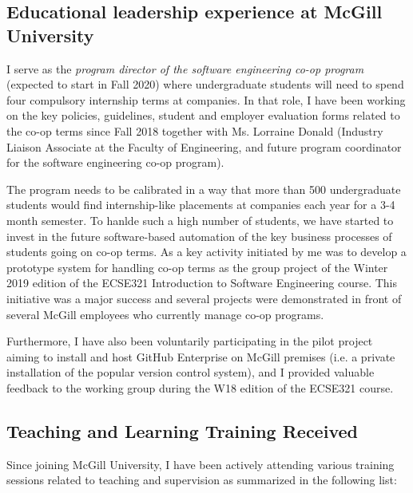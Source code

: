 \subsection{Educational leadership experience at McGill University}


I serve as the \emph{program director of the software engineering co-op program} (expected to start in 
Fall 2020) where undergraduate students will need to spend four compulsory internship terms at companies. In that role, I 
have been working on the key policies, guidelines, student and employer evaluation forms related to the co-op terms since 
Fall 2018 together with Ms. Lorraine Donald (Industry Liaison Associate at the Faculty of Engineering, and future 
program coordinator for the software engineering co-op program). 

The program needs to be calibrated in a way that more than 500 undergraduate students would find internship-like 
placements at companies each year for a 3-4 month semester. To hanlde such a high number of 
students, we have started to invest in the future software-based automation of the key business processes of 
students going on co-op terms. As a key activity initiated by me was to develop a prototype system for handling co-op terms 
as the group project of the Winter 2019 edition of the ECSE321 Introduction to Software Engineering course. This initiative 
was a major success and several projects were demonstrated in front of several McGill employees who currently manage 
co-op programs. 

Furthermore, I have also been voluntarily participating in the pilot project aiming to install and host GitHub Enterprise on McGill premises (i.e. a private installation of the popular version control system), and I provided valuable feedback to the working group during the W18 edition of the ECSE321 course.

\subsection{Teaching and Learning Training Received}
Since joining McGill University, I have been actively attending various training sessions related to teaching and supervision as summarized in the following list:

